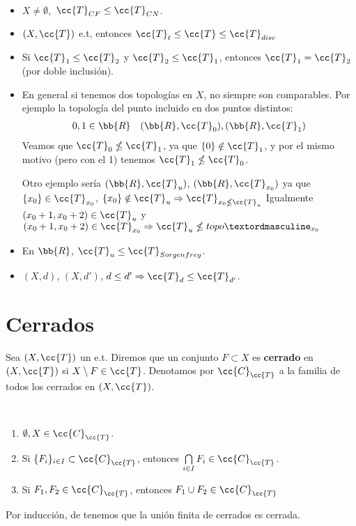 \begin{ejemplo}\
    \begin{itemize}
        \item $X \neq \emptyset$,\ $\cc{T}_{CF}\leq \cc{T}_{CN}$.
        \item $(X,\cc{T})$ e.t, entonces $\cc{T}_t \leq \cc{T} \leq \cc{T}_{disc}$ 
        \item Si $\cc{T}_1 \leq \cc{T}_2$ y $\cc{T}_2\leq \cc{T}_1$, entonces $\cc{T}_1= \cc{T}_2$ (por doble inclusión).
        \item En general si tenemos dos topologías en $X$, no siempre son comparables. Por ejemplo la topología del punto incluido en dos puntos distintos: 
        \begin{gather*}
            0,1\in \bb{R}\ \ \ (\bb{R}, \cc{T}_0), (\bb{R},\cc{T}_1)
        \end{gather*}
        Veamos que $\cc{T}_0 \nleq \cc{T}_1$, ya que $\{0\}\notin \cc{T}_1$, y por el mismo motivo (pero con el 1) tenemos $\cc{T}_1\nleq \cc{T}_0$.

        Otro ejemplo sería $(\bb{R}, \cc{T}_u)$, $(\bb{R},\cc{T}_{x_0})$ ya que $\{x_0\}\in \cc{T}_{x_0}$, $\{x_0\}\notin \cc{T}_u\Rightarrow \cc{T}_{x_0\nleq \cc{T}_u}$
        Igualmente $(x_0+1,x_0+2)\in \cc{T}_u$ y $(x_0+1,x_0+2)\in \cc{T}_{x_0} \Rightarrow \cc{T}_u \nleq topoº_{x_0}$
        \item En $\bb{R}$, $\cc{T}_u\leq \cc{T}_{Sorgenfrey}$.
        \item $(X,d)$, $(X,d')$, $d \leq d' \Rightarrow \cc{T}_d \leq \cc{T}_{d'}$.
    \end{itemize}
    \endsquare
\end{ejemplo}

\section{Cerrados}

\begin{definicion}
    Sea $(X,\cc{T})$ un e.t. Diremos que un conjunto $F\subset X$ es \textbf{cerrado} en $(X,\cc{T})$ si $X\setminus F \in \cc{T}$. Denotamos por $\cc{C}_{\cc{T}}$ a la familia de todos los cerrados en $(X,\cc{T})$.
    \endsquare
\end{definicion}

\begin{propiedades}\ 
    \begin{enumerate}
        \item[\objetivo{C1}] $\emptyset, X \in \cc{C}_{\cc{T}}$.
        \item[\objetivo{C2}] Si $\{F_i\}_{i\in I}\subset \cc{C}_{\cc{T}}$, entonces $\bigcap\limits_{i\in I}F_i \in \cc{C}_{\cc{T}}$.
        \item[\objetivo{C3}] Si $F_1, F_2 \in \cc{C}_{\cc{T}}$, entonces $F_1 \cup F_2 \in \cc{C}_{\cc{T}}$
    \end{enumerate}
    Por inducción, de \apuntar{C3} tenemos que la unión finita de cerrados es cerrada.\\
\end{propiedades}

